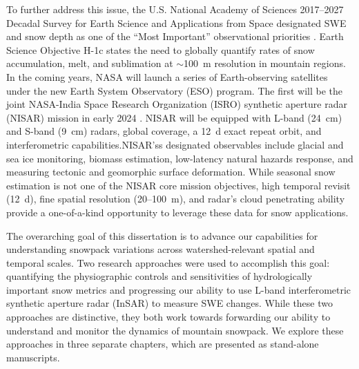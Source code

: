 To further address this issue, the U.S. National Academy of Sciences 2017--2027 Decadal Survey for Earth Science and Applications from Space designated SWE and snow depth as one of the ``Most Important” observational priorities \citep{nationalacademiesofsciencesengineeringandmedicineThrivingOurChanging2019}. Earth Science Objective H-1c states the need to globally quantify rates of snow accumulation, melt, and sublimation at $\sim$100~m resolution in mountain regions. In the coming years, NASA will launch a series of Earth-observing satellites under the new Earth System Observatory (ESO) program. The first will be the joint NASA-India Space Research Organization (ISRO) synthetic aperture radar (NISAR) mission in early 2024 \citep{rosenNASAISROSARNISAR2017, kelloggNASAISROSyntheticAperture2020}. NISAR will be equipped with L-band (24~cm) and S-band (9~cm) radars, global coverage, a 12~d exact repeat orbit, and interferometric capabilities.NISAR'ss designated observables include glacial and sea ice monitoring, biomass estimation, low-latency natural hazards response, and measuring tectonic and geomorphic surface deformation. While seasonal snow estimation is not one of the NISAR core mission objectives, high temporal revisit (12~d), fine spatial resolution (20--100~m), and radar's cloud penetrating ability provide a one-of-a-kind opportunity to leverage these data for snow applications.

The overarching goal of this dissertation is to advance our capabilities for understanding snowpack variations across watershed-relevant spatial and temporal scales. Two research approaches were used to accomplish this goal: quantifying the physiographic controls and sensitivities of hydrologically important snow metrics and progressing our ability to use L-band interferometric synthetic aperture radar (InSAR) to measure SWE changes. While these two approaches are distinctive, they both work towards forwarding our ability to understand and monitor the dynamics of mountain snowpack. We explore these approaches in three separate chapters, which are presented as stand-alone manuscripts. 

